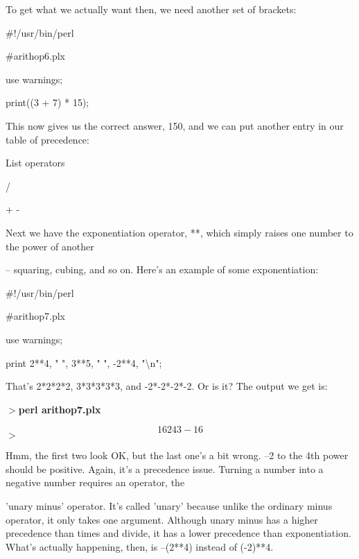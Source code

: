 \documentclass[a4paper,11pt]{book}
\begin{document}
\noindent 

\noindent To get what we actually want then, we need another set of brackets:

\noindent 

\noindent \#!/usr/bin/perl

\noindent \#arithop6.plx

\noindent use warnings;

\noindent print((3 + 7) * 15);

\noindent 

\noindent This now gives us the correct answer, 150, and we can put another entry in our table of precedence:

\noindent 

\noindent List operators

\noindent 

\noindent * /

\noindent 

\noindent + -

\noindent 

\noindent 

\noindent Next we have the exponentiation operator, **, which simply raises one number to the power of another

\noindent -- squaring, cubing, and so on. Here's an example of some exponentiation:

\noindent 

\noindent 

\noindent \#!/usr/bin/perl

\noindent \#arithop7.plx

\noindent use warnings;

\noindent print 2**4, " ", 3**5, " ", -2**4, "\textbackslash n";

\noindent 

\noindent That's 2*2*2*2, 3*3*3*3*3, and -2*-2*-2*-2. Or is it? The output we get is:

\noindent $>$\textbf{perl arithop7.plx}

\[16 243 -16\] 
$>$

\noindent 

\noindent Hmm, the first two look OK, but the last one's a bit wrong. --2 to the 4th   power should be positive. Again, it's a precedence issue. Turning a number into a negative number requires an operator, the

\noindent 'unary minus' operator. It's called 'unary' because unlike the ordinary minus operator, it only takes one argument. Although unary minus has a higher precedence than times and divide, it has a lower precedence than exponentiation. What's actually happening, then, is --(2**4) instead of (-2)**4.
\end{document}
